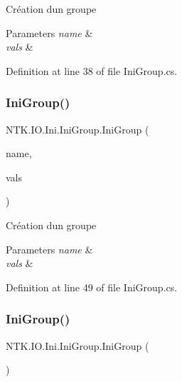 Création d\textquotesingle{}un groupe 


\begin{DoxyParams}{Parameters}
{\em name} & \\
\hline
{\em vals} & \\
\hline
\end{DoxyParams}


Definition at line 38 of file Ini\+Group.\+cs.

\mbox{\label{class_n_t_k_1_1_i_o_1_1_ini_1_1_ini_group_a8bb4afc68166c6697f3c22f7abe2596a}} 
\subsubsection{\texorpdfstring{IniGroup()}{IniGroup()}\hspace{0.1cm}{\footnotesize\ttfamily [3/4]}}
{\footnotesize\ttfamily N\+T\+K.\+I\+O.\+Ini.\+Ini\+Group.\+Ini\+Group (\begin{DoxyParamCaption}\item[{String}]{name,  }\item[{List$<$ \mbox{\hyperlink{class_n_t_k_1_1_i_o_1_1_ini_1_1_ini_value}{Ini\+Value}} $>$}]{vals }\end{DoxyParamCaption})}



Création d\textquotesingle{}un groupe 


\begin{DoxyParams}{Parameters}
{\em name} & \\
\hline
{\em vals} & \\
\hline
\end{DoxyParams}


Definition at line 49 of file Ini\+Group.\+cs.

\mbox{\label{class_n_t_k_1_1_i_o_1_1_ini_1_1_ini_group_afc9fb568632d521e30074838de847e4b}} 
\subsubsection{\texorpdfstring{IniGroup()}{IniGroup()}\hspace{0.1cm}{\footnotesize\ttfamily [4/4]}}
{\footnotesize\ttfamily N\+T\+K.\+I\+O.\+Ini.\+Ini\+Group.\+Ini\+Group (\begin{DoxyParamCaption}{ }\end{DoxyParamCaption})}



